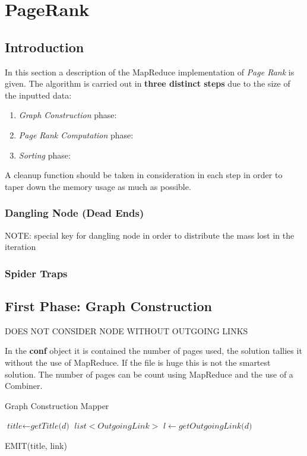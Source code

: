 \section{PageRank}

\subsection{Introduction}
In this section a description of the MapReduce implementation of \textit{Page Rank} is given.
The algorithm is carried out in \textbf{three distinct steps} due to the size of the inputted data:
\begin{enumerate}
	\item \textit{Graph Construction} phase:
	\item \textit{Page Rank Computation} phase:
	\item \textit{Sorting} phase:
\end{enumerate}
A cleanup function should be taken in consideration in each step in order to taper down the memory usage as much as possible.

\subsubsection{Dangling Node (Dead Ends)}
NOTE: special key for dangling node in order to distribute the mass lost in the iteration

\subsubsection{Spider Traps}

\subsection{First Phase: Graph Construction}
DOES NOT CONSIDER NODE WITHOUT OUTGOING LINKS

In the \textbf{conf} object it is contained the number of pages used, the solution tallies it without the use of MapReduce. If the file is huge this is not the smartest solution. The number of pages can be count using MapReduce and the use of a Combiner.

\begin{algorithm}
	\caption{Graph Construction Mapper}\label{Mapper}
		\begin{algorithmic}[1]
					\State $\textit{title} \gets \textit{getTitle(d)}$
					\State $ \textit{list$<$OutgoingLink$>$ l} \gets \textit{getOutgoingLink(d)}$
		
							\State EMIT(title, link)
						\EndFor
					\EndIf
			\EndProcedure
	\end{algorithmic}
\end{algorithm}

